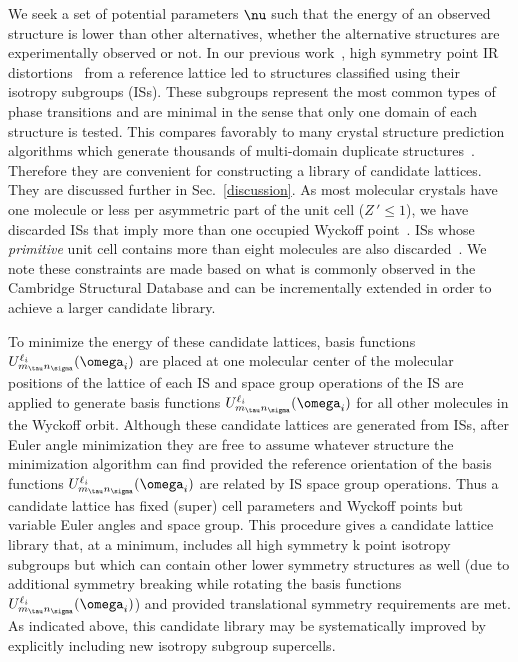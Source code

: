 \documentclass[preprint]{iucr}              %
\newcommand{\mb}[1]{\ensuremath{\mbox{\boldmath $ #1 $}}}
\begin{document}
We seek a set of potential parameters $\mb{\nu}$ such that the
energy of an observed structure is lower than other alternatives, whether the
alternative structures are experimentally observed or not. In our previous
work~\cite{Mettes04}, high
symmetry point IR distortions~\cite{Stokes88,Stokes07} from a
reference lattice led to structures classified using their isotropy
subgroups (ISs). These subgroups represent the most common types of
phase transitions and are minimal in the sense that only one domain
of each structure is tested. This compares favorably to many crystal
structure prediction algorithms which generate thousands of multi-domain
duplicate structures~\cite{Gavezzotti07}.  Therefore they are convenient for
constructing a library of candidate lattices. They are discussed
further in Sec.~\ref{discussion}.  As most molecular crystals have
one molecule or less per asymmetric part of the unit cell ($Z\,'\leq
1$), we have discarded ISs that imply more than one occupied Wyckoff
point~\cite{Padmaja90}. ISs whose \emph{primitive} unit cell
contains more than eight molecules are also
discarded~\cite{Gdanitz97}. We note these constraints are made based on what is
commonly observed in the Cambridge Structural Database and can be incrementally
extended in order to achieve a larger candidate library.


To minimize the energy of these candidate lattices,
basis functions $U^{\ell_i}_{m_\tau n_\sigma}(\mb{\omega}_i)$ are placed at one
molecular center of the molecular positions of the lattice of each
IS and space group operations of the IS are applied to generate
basis functions $U^{\ell_i}_{m_\tau n_\sigma}(\mb{\omega}_i)$ for all other
molecules in the Wyckoff orbit. Although these candidate lattices are generated
from ISs, after Euler angle minimization they are free to assume
whatever structure the minimization algorithm can find provided the
reference orientation of the basis functions $U^{\ell_i}_{m_\tau
n_\sigma}(\mb{\omega}_i)$ are related by IS space group operations. Thus a
candidate lattice has fixed (super) cell parameters and Wyckoff
points but variable Euler angles and space group. This procedure gives a
candidate lattice library that, at a minimum, includes all high symmetry k point
isotropy subgroups but which can contain other lower symmetry structures as well
(due to additional symmetry breaking while rotating the basis functions
$U^{\ell_i}_{m_\tau n_\sigma}(\mb{\omega}_i)$) and  provided translational
symmetry requirements are met.  As indicated above, this candidate library may
be systematically improved by explicitly including new isotropy subgroup
supercells.
\end{document}
